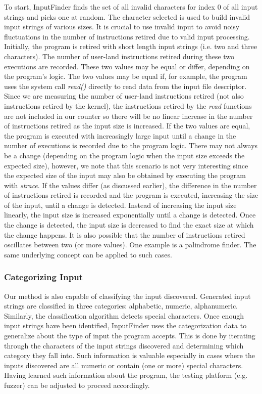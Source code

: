 \documentclass{acm_proc_article-sp}
\def \tool {InputFinder}
\begin{document}
To start, \tool{} finds the set of all invalid characters for index 0 of all input strings and picks one at random.
The character selected is used to build invalid input strings of various sizes.
It is crucial to use invalid input to avoid noisy fluctuations in the number of instructions retired due to valid input processing.
Initially, the program is retired with short length input strings (i.e. two and three characters).
The number of user-land instructions retired during these two executions are recorded.
These two values may be equal or differ, depending on the program's logic.
The two values may be equal if, for example, the program uses the system call \textit{read()} directly to read data from the input file descriptor.
Since we are measuring the number of user-land instructions retired (not also instructions retired by the kernel), the instructions retired by the \textit{read} functions are not included in our counter so there will be no linear increase in the number of instructions retired as the input size is increased.
If the two values are equal, the program is executed with increasingly large input until a change in the number of executions is recorded due to the program logic.
There may not always be a change (depending on the program logic when the input size exceeds the expected size), however, we note that this scenario is not very interesting since the expected size of the input may also be obtained by executing the program with \textit{strace}.
If the values differ (as discussed earlier), the difference in the number of instructions retired is recorded and the program is executed, increasing the size of the input, until a change is detected.
Instead of increasing the input size linearly, the input size is increased exponentially until a change is detected.
Once the change is detected, the input size is decreased to find the exact size at which the change happens.
It is also possible that the number of instructions retired oscillates between two (or more values).
One example is a palindrome finder.
The same underlying concept can be applied to such cases.

\subsubsection{Categorizing Input}
Our method is also capable of classifying the input discovered.
Generated input strings are classified in three categories: alphabetic, numeric, alphanumeric.
Similarly, the classification algorithm detects special characters.
Once enough input strings have been identified, \tool{} uses the categorization data to generalize about the type of input the program accepts.
This is done by iterating through the characters of the input strings discovered and determining which category they fall into.
Such information is valuable especially in cases where the inputs discovered are all numeric or contain (one or more) special characters.
Having learned such information about the program, the testing platform (e.g. fuzzer) can be adjusted to proceed accordingly.
\end{document}
